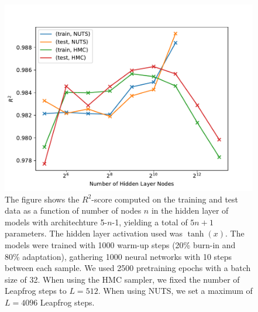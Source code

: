 \begin{figure}[H]
    \centering
    \includegraphics[scale=0.7]{figures/r2_scores/r2_score_vs_num_params_log_space.pdf}
    \caption{
        The figure shows the $R^2$-score computed on the training and test data as a function of number of nodes $n$ in the hidden layer of models with architechture 5-$n$-1, yielding a total of $5n + 1$ parameters. The hidden layer activation used was $\tanh(x)$.
        The models were trained with 1000 warm-up steps (20\% burn-in and 80\% adaptation), gathering 1000 neural networks with 10 steps between each sample. We used 2500 pretraining epochs with a batch size of 32. 
        When using the HMC sampler, we fixed the number of Leapfrog steps to $L = 512$. When using NUTS, we set a maximum of $L = 4096$ Leapfrog steps. 
    }\label{fig:r2_scores_vs_num_params}
\end{figure}


